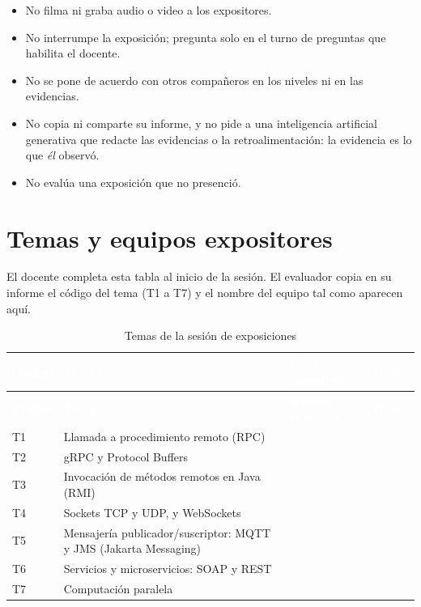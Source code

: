 \documentclass[11pt,a4paper]{article}
\newcommand{\hdr}[1]{\textcolor{white}{\textbf{#1}}}
\begin{document}
\begin{avisoBox}[title={Qué NO debe hacer el evaluador}]
	\begin{itemize}
		\item No filma ni graba audio o video a los expositores.
		\item No interrumpe la exposición; pregunta solo en el turno de preguntas que habilita el docente.
		\item No se pone de acuerdo con otros compañeros en los niveles ni en las evidencias.
		\item No copia ni comparte su informe, y no pide a una inteligencia artificial generativa que redacte las evidencias o la retroalimentación: la evidencia es lo que \emph{él} observó.
		\item No evalúa una exposición que no presenció.
	\end{itemize}
\end{avisoBox}

\section{Temas y equipos expositores}\label{sec:temas}

El docente completa esta tabla al inicio de la sesión. El evaluador copia en su informe el código del tema (T1 a T7) y el nombre del equipo tal como aparecen aquí.

{\small
\begin{xltabular}{\linewidth}{@{}C{1.5cm}L{6.4cm}YC{1.6cm}@{}}
	\caption{Temas de la sesión de exposiciones}\label{tab:temas}\\
	\toprule
	\hdr{Código} & \hdr{Tema} & \hdr{Equipo expositor} & \hdr{Orden} \\
	\midrule
	\endfirsthead
	\toprule
	\hdr{Código} & \hdr{Tema} & \hdr{Equipo expositor} & \hdr{Orden} \\
	\midrule
	\endhead
	T1 & Llamada a procedimiento remoto (RPC) & & \\
	T2 & gRPC y Protocol Buffers & & \\
	T3 & Invocación de métodos remotos en Java (RMI) & & \\
	T4 & Sockets TCP y UDP, y WebSockets & & \\
	T5 & Mensajería publicador/suscriptor: MQTT y JMS (Jakarta Messaging) & & \\
	T6 & Servicios y microservicios: SOAP y REST & & \\
	T7 & Computación paralela & & \\
	\bottomrule
\end{xltabular}
}
\end{document}
